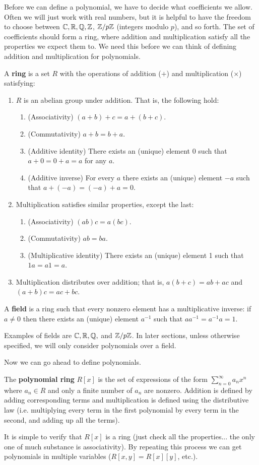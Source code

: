 Before we can define a polynomial, we have to decide what coefficients we allow. Often we will just work with real numbers, but it is helpful to have the freedom to choose between $\mathbb{C}, \mathbb{R}, \mathbb{Q}, \mathbb{Z}$, $\mathbb{Z}/p\mathbb{Z}$ (integers modulo $p$), and so forth. The set of coefficients should form a ring, where addition and multiplication satisfy all the properties we expect them to. We need this before we can think of defining addition and multiplication for polynomials.
\begin{df}
A \textbf{ring} is a set $R$ with the operations of addition ($+$) and multiplication ($\times$) satisfying:
\begin{enumerate}
\item
$R$ is an abelian group under addition. That is, the following hold:
\begin{enumerate}
\item (Associativity) $(a+b)+c=a+(b+c)$.
\item (Commutativity) $a+b=b+a$.
\item (Additive identity) There exists an (unique) element 0 such that $a+0=0+a=a$ for any $a$.
\item (Additive inverse) For every $a$ there exists an (unique) element $-a$ such that $a+(-a)=(-a)+a=0$.
\end{enumerate}
\item Multiplication satisfies similar properties, except the last:
\begin{enumerate}
\item (Associativity) $(ab)c=a(bc)$.
\item (Commutativity) $ab=ba$.
\item (Multiplicative identity) There exists an (unique) element 1 such that $1a=a1=a$.
\end{enumerate}
\item Multiplication distributes over addition; that is, $a(b+c)=ab+ac$ and $(a+b)c=ac+bc$.
\end{enumerate}
A \textbf{field} is a ring such that every nonzero element has a multiplicative inverse: if $a\neq 0$ then there exists an (unique) element $a^{-1}$ such that $aa^{-1}=a^{-1}a=1$.
\end{df}
Examples of fields are $\mathbb{C}, \mathbb{R}, \mathbb{Q},$ and $\mathbb{Z}/p\mathbb{Z}$. In later sections, unless otherwise specified, we will only consider polynomials over a field.

Now we can go ahead to define polynomials.
\begin{df}
The \textbf{polynomial ring} $R[x]$ is the set of expressions of the form $\sum_{n=0}^{\infty} a_nx^n$ where $a_n\in R$ and only a finite number of $a_n$ are nonzero. Addition is defined by adding corresponding terms and multiplication is defined using the distributive law (i.e. multiplying every term in the first polynomial by every term in the second, and adding up all the terms).
\end{df}
It is simple to verify that $R[x]$ is a ring (just check all the properties... the only one of much substance is associativity). By repeating this process we can get polynomials in multiple variables ($R[x,y]=R[x][y]$, etc.).

